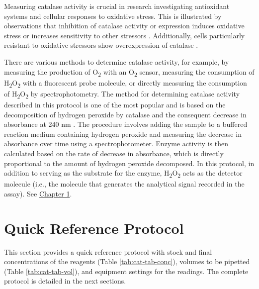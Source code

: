 \documentclass[
  9pt,
  american,
  a5paper,
  extrafontsizes,onecolumn,openright
  ]{memoir}
\begin{document}
Measuring catalase activity is crucial in research investigating antioxidant systems and cellular responses to oxidative stress. This is illustrated by observations that inhibition of catalase activity or expression induces oxidative stress \autocite{bagnyukova_catalase_2005} or increases sensitivity to other stressors \autocite{ho_mice_2004}. Additionally, cells particularly resistant to oxidative stressors show overexpression of catalase \autocite{spitz_mechanisms_1992}.

There are various methods to determine catalase activity, for example, by measuring the production of O\textsubscript{2} with an O\textsubscript{2} sensor, measuring the consumption of H\textsubscript{2}O\textsubscript{2} with a fluorescent probe molecule, or directly measuring the consumption of H\textsubscript{2}O\textsubscript{2} by spectrophotometry. The method for determining catalase activity described in this protocol is one of the most popular and is based on the decomposition of hydrogen peroxide by catalase and the consequent decrease in absorbance at 240 nm \autocite{aebi_catalase_1984}. The procedure involves adding the sample to a buffered reaction medium containing hydrogen peroxide and measuring the decrease in absorbance over time using a spectrophotometer. Enzyme activity is then calculated based on the rate of decrease in absorbance, which is directly proportional to the amount of hydrogen peroxide decomposed. In this protocol, in addition to serving as the substrate for the enzyme, H\textsubscript{2}O\textsubscript{2} acts as the detector molecule (i.e., the molecule that generates the analytical signal recorded in the assay). See \hyperref[chapter1]{Chapter 1}.

\newpage

\section{Quick Reference Protocol}\label{cat-quick-ref}

This section provides a quick reference protocol with stock and final concentrations of the reagents (Table \ref{tab:cat-tab-conc}), volumes to be pipetted (Table \ref{tab:cat-tab-vol}), and equipment settings for the readings. The complete protocol is detailed in the next sections.





\scriptsize
\end{document}
